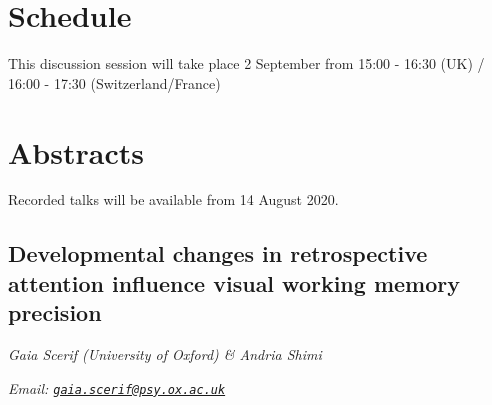 \documentclass[12pt,]{book}
\begin{document}
\hypertarget{schedule-3}{%
\section{Schedule}\label{schedule-3}}

This discussion session will take place 2 September from 15:00 - 16:30 (UK) / 16:00 - 17:30 (Switzerland/France)

\hypertarget{abstracts-3}{%
\section{Abstracts}\label{abstracts-3}}

Recorded talks will be available from 14 August 2020.

\hypertarget{developmental-changes-in-retrospective-attention-influence-visual-working-memory-precision}{%
\subsection{Developmental changes in retrospective attention influence visual working memory precision}\label{developmental-changes-in-retrospective-attention-influence-visual-working-memory-precision}}

\emph{Gaia Scerif (University of Oxford) \& Andria Shimi}

\emph{Email: \href{mailto:gaia.scerif@psy.ox.ac.uk}{\nolinkurl{gaia.scerif@psy.ox.ac.uk}}}
\end{document}
